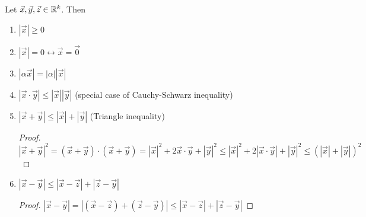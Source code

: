 \begin{theorem}
	Let $\vec{x},\vec{y}, \vec{z} \in \mathbb{R}^{k} $. Then
	\begin{enumerate}[label=(\alph*)]
		\item $|\vec{x}|\ge 0$
		\item $|\vec{x}|=0 \leftrightarrow \vec{x}=\vec{0}$
		\item $|\alpha \vec{x}|=|\alpha| |\vec{x}|$
		\item $|\vec{x} \cdot \vec{y}|\le |\vec{x}||\vec{y}|$ (special case of Cauchy-Schwarz inequality)
		\item $|\vec{x}+\vec{y}|\le |\vec{x}|+|\vec{y}|$ (Triangle inequality)
		      \begin{proof}
			      $|\vec{x}+\vec{y}|^2=(\vec{x}+\vec{y})\cdot (\vec{x}+\vec{y})=
				      |\vec{x}|^2 + 2 \vec{x} \cdot \vec{y}+|\vec{y}|^2
				      \le |\vec{x}|^2 + 2 |\vec{x} \cdot \vec{y}|+|\vec{y}|^2
				      \le (|\vec{x}|+|\vec{y}|)^2
			      $
		      \end{proof}
		\item $|\vec{x}-\vec{y}|\le |\vec{x}-\vec{z}|+|\vec{z} -\vec{y}|$
		      \begin{proof}
			      $|\vec{x}-\vec{y}|=
				      |(\vec{x}-\vec{z})+(\vec{z}-\vec{y})| \le |\vec{x}-\vec{z}|+|\vec{z}-\vec{y}|
			      $
		      \end{proof}
	\end{enumerate}
\end{theorem}


